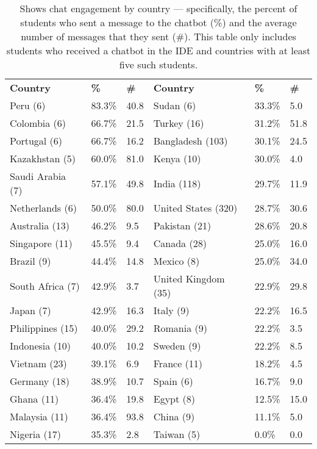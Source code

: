 \begin{table}
\centering
\begin{tabularx}{\columnwidth}{P{2cm} Y Y @{\hskip 3mm} P{2cm} Y Y}
\toprule
\textbf{Country} & \textbf{\%} & \textbf{\#} & \textbf{Country} & \textbf{\%} & \textbf{\#} \\
\cmidrule(r{3mm}){1-3} \cmidrule(l{0mm}){4-6} 
Peru (6) & 83.3\% & 40.8 & Sudan (6) & 33.3\% & 5.0 \\
Colombia (6) & 66.7\% & 21.5 & Turkey (16) & 31.2\% & 51.8 \\
Portugal (6) & 66.7\% & 16.2 & Bangladesh (103) & 30.1\% & 24.5 \\
Kazakhstan (5) & 60.0\% & 81.0 & Kenya (10) & 30.0\% & 4.0 \\
Saudi Arabia (7) & 57.1\% & 49.8 & India (118) & 29.7\% & 11.9 \\
Netherlands (6) & 50.0\% & 80.0 & United States (320) & 28.7\% & 30.6 \\
Australia (13) & 46.2\% & 9.5 & Pakistan (21) & 28.6\% & 20.8 \\
Singapore (11) & 45.5\% & 9.4 & Canada (28) & 25.0\% & 16.0 \\
Brazil (9) & 44.4\% & 14.8 & Mexico (8) & 25.0\% & 34.0 \\
South Africa (7) & 42.9\% & 3.7 & United Kingdom (35) & 22.9\% & 29.8 \\
Japan (7) & 42.9\% & 16.3 & Italy (9) & 22.2\% & 16.5 \\
Philippines (15) & 40.0\% & 29.2 & Romania (9) & 22.2\% & 3.5 \\
Indonesia (10) & 40.0\% & 10.2 & Sweden (9) & 22.2\% & 8.5 \\
Vietnam (23) & 39.1\% & 6.9 & France (11) & 18.2\% & 4.5 \\
Germany (18) & 38.9\% & 10.7 & Spain (6) & 16.7\% & 9.0 \\
Ghana (11) & 36.4\% & 19.8 & Egypt (8) & 12.5\% & 15.0 \\
Malaysia (11) & 36.4\% & 93.8 & China (9) & 11.1\% & 5.0 \\
Nigeria (17) & 35.3\% & 2.8 & Taiwan (5) & 0.0\% & 0.0 \\
\bottomrule
\end{tabularx}
\caption{Shows chat engagement by country --- specifically, the percent of students who sent a message to the chatbot (\%) and the average number of messages that they sent (\#). This table only includes students who received a chatbot in the IDE and countries with at least five such students.}
\label{tab:avg_messages_country}
\end{table}